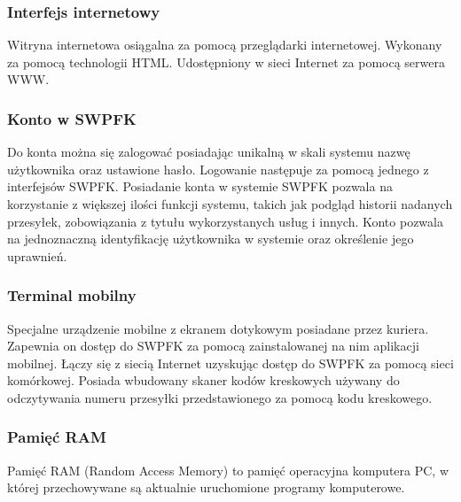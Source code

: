 \subsubsection*{Interfejs internetowy}
Witryna internetowa osiągalna za pomocą przeglądarki internetowej. Wykonany za pomocą technologii HTML. Udostępniony w sieci Internet za pomocą serwera WWW.

\subsubsection*{Konto w SWPFK}
Do konta można się zalogować posiadając unikalną w skali systemu nazwę użytkownika oraz ustawione hasło. Logowanie następuje za pomocą jednego z interfejsów SWPFK. Posiadanie konta w systemie SWPFK pozwala na korzystanie z większej ilości funkcji systemu, takich jak podgląd historii nadanych przesyłek, zobowiązania z tytułu wykorzystanych usług i innych. Konto pozwala na jednoznaczną identyfikację użytkownika w systemie oraz określenie jego uprawnień.

\subsubsection*{Terminal mobilny}
Specjalne urządzenie mobilne z ekranem dotykowym posiadane przez kuriera. Zapewnia on dostęp do SWPFK za pomocą zainstalowanej na nim aplikacji mobilnej. Łączy się z siecią Internet uzyskując dostęp do SWPFK za pomocą sieci komórkowej. Posiada wbudowany skaner kodów kreskowych używany do odczytywania numeru przesyłki przedstawionego za pomocą kodu kreskowego.

\subsubsection*{Pamięć RAM}
Pamięć RAM (Random Access Memory) to pamięć operacyjna komputera PC, w której przechowywane są aktualnie uruchomione programy komputerowe.